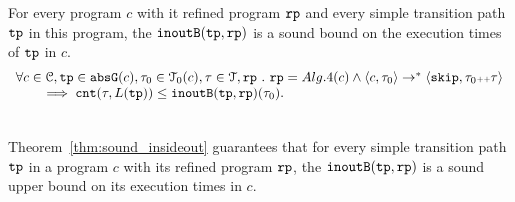 %
\begin{thm}
  \label{thm:sound_insideout}
  For every program $c$ with it refined program $\mathtt{rp}$ and 
  every simple transition path $\mathtt{tp}$ in this program,
   the $\mathtt{inoutB}(\mathtt{tp}, \mathtt{rp})$
is a sound bound on the execution times of $\mathtt{tp}$ in $c$.
  \[
    \begin{array}{l}
    \forall c \in \mathcal{C}, \mathtt{tp} \in \mathtt{abs}{\mathtt{G}}(c), \mathtt{\tau}_0 \in \mathcal{T}_0(c), \mathtt{\tau} \in \mathcal{T}, \mathtt{rp} ~.~ 
    \mathtt{rp} = Alg.4(c)
    \land
    \langle c, \mathtt{\tau}_0 \rangle \to^* 
    \langle {\ensuremath{\mathtt{skip}}, \ensuremath{\mathtt{\tau}}_0 {\scriptscriptstyle ++}\ensuremath{\mathtt{\tau}}} \rangle
    \\ \qquad
    \implies
    \mathtt{cnt}(\mathtt{\tau}, L(\mathtt{tp})) \leq \mathtt{inoutB}(\mathtt{tp}, \mathtt{rp})(\mathtt{\tau}_0).
    \end{array}
    \]
\end{thm}
\\
Theorem~\ref{thm:sound_insideout} guarantees that
for every simple transition path $\mathtt{tp}$ in a program $c$ with its refined program $\mathtt{rp}$,
the $\mathtt{inoutB}(\mathtt{tp}, \mathtt{rp})$
is a sound upper bound on its execution times in $c$.
%
